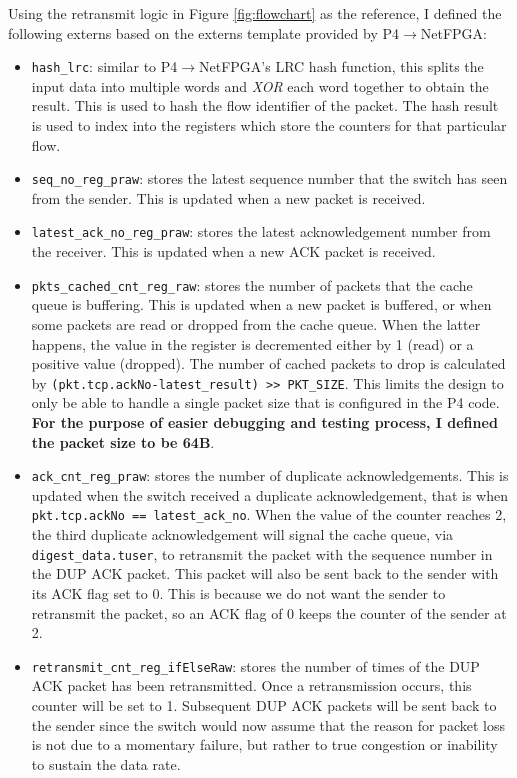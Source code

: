 Using the retransmit logic in Figure \ref{fig:flowchart} as the reference, I defined the following externs based on the externs template provided by P4$\rightarrow$NetFPGA:
\begin{itemize}[leftmargin=*, noitemsep]
	\item \verb|hash_lrc|: similar to P4$\rightarrow$NetFPGA's LRC hash function, this splits the input data into multiple words and \textit{XOR} each word together to obtain the result. This is used to hash the flow identifier of the packet. The hash result is used to index into the registers which store the counters for that particular flow.
	\item \verb|seq_no_reg_praw|: stores the latest sequence number that the switch has seen from the sender. This is updated when a new packet is received.
	\item \verb|latest_ack_no_reg_praw|: stores the latest acknowledgement number from the receiver. This is updated when a new ACK packet is received.
	\item \verb|pkts_cached_cnt_reg_raw|: stores the number of packets that the cache queue is buffering. This is updated when a new packet is buffered, or when some packets are read or dropped from the cache queue. When the latter happens, the value in the register is decremented either by 1 (read) or a positive value (dropped). The number of cached packets to drop is calculated by \verb|(pkt.tcp.ackNo-latest_result) >> PKT_SIZE|. This limits the design to only be able to handle a single packet size that is configured in the P4 code. \textbf{For the purpose of easier debugging and testing process, I defined the packet size to be 64B}.
	\item \verb|ack_cnt_reg_praw|: stores the number of duplicate acknowledgements. This is updated when the switch received a duplicate acknowledgement, that is when \verb|pkt.tcp.ackNo == latest_ack_no|. When the value of the counter reaches 2, the third duplicate acknowledgement will signal the cache queue, via \verb|digest_data.tuser|, to retransmit the packet with the sequence number in the DUP ACK packet. This packet will also be sent back to the sender with its ACK flag set to 0. This is because we do not want the sender to retransmit the packet, so an ACK flag of 0 keeps the counter of the sender at 2.
	\item \verb|retransmit_cnt_reg_ifElseRaw|: stores the number of times of the DUP ACK packet has been retransmitted. Once a retransmission occurs, this counter will be set to 1. Subsequent DUP ACK packets will be sent back to the sender since the switch would now assume that the reason for packet loss is not due to a momentary failure, but rather to true congestion or inability to sustain the data rate.
\end{itemize}

